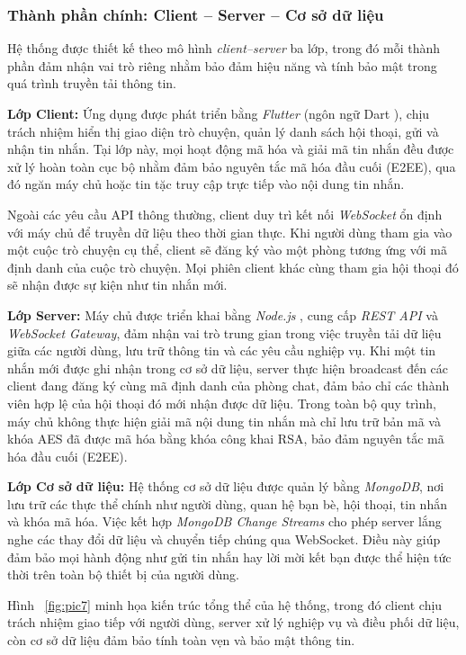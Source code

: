 \subsubsection{Thành phần chính: Client – Server – Cơ sở dữ liệu}
\indent Hệ thống được thiết kế theo mô hình \textit{client–server} ba lớp, trong đó mỗi thành phần đảm nhận vai trò riêng nhằm bảo đảm hiệu năng và tính bảo mật trong quá trình truyền tải thông tin.

\indent \textbf{Lớp Client:} Ứng dụng được phát triển bằng \textit{Flutter} (ngôn ngữ Dart \cite{dart_spec}), chịu trách nhiệm hiển thị giao diện trò chuyện, quản lý danh sách hội thoại, gửi và nhận tin nhắn.  
Tại lớp này, mọi hoạt động mã hóa và giải mã tin nhắn đều được xử lý hoàn toàn cục bộ nhằm đảm bảo nguyên tắc mã hóa đầu cuối (E2EE), qua đó ngăn máy chủ hoặc tin tặc truy cập trực tiếp vào nội dung tin nhắn.

\indent Ngoài các yêu cầu API thông thường, client duy trì kết nối \textit{WebSocket} ổn định với máy chủ để truyền dữ liệu theo thời gian thực. Khi người dùng tham gia vào một cuộc trò chuyện cụ thể, client sẽ đăng ký vào một phòng tương ứng với mã định danh của cuộc trò chuyện.  
Mọi phiên client khác cùng tham gia hội thoại đó sẽ nhận được sự kiện như tin nhắn mới.

\indent \textbf{Lớp Server:} Máy chủ được triển khai bằng \textit{Node.js} \cite{nodejs_website}, cung cấp \textit{REST API} và \textit{WebSocket Gateway}, đảm nhận vai trò trung gian trong việc truyền tải dữ liệu giữa các người dùng, lưu trữ thông tin và các yêu cầu nghiệp vụ.  
Khi một tin nhắn mới được ghi nhận trong cơ sở dữ liệu, server thực hiện broadcast đến các client đang đăng ký cùng mã định danh của phòng chat, đảm bảo chỉ các thành viên hợp lệ của hội thoại đó mới nhận được dữ liệu.  
Trong toàn bộ quy trình, máy chủ không thực hiện giải mã nội dung tin nhắn mà chỉ lưu trữ bản mã và khóa AES đã được mã hóa bằng khóa công khai RSA, bảo đảm nguyên tắc mã hóa đầu cuối (E2EE).

\indent \textbf{Lớp Cơ sở dữ liệu:} Hệ thống cơ sở dữ liệu được quản lý bằng \textit{MongoDB}, nơi lưu trữ các thực thể chính như người dùng, quan hệ bạn bè, hội thoại, tin nhắn và khóa mã hóa.  
Việc kết hợp \textit{MongoDB Change Streams} cho phép server lắng nghe các thay đổi dữ liệu và chuyển tiếp chúng qua WebSocket. Điều này giúp đảm bảo mọi hành động như gửi tin nhắn hay lời mời kết bạn được thể hiện tức thời trên toàn bộ thiết bị của người dùng.

\indent Hình ~\ref{fig:pic7} minh họa kiến trúc tổng thể của hệ thống, trong đó client chịu trách nhiệm giao tiếp với người dùng, server xử lý nghiệp vụ và điều phối dữ liệu, còn cơ sở dữ liệu đảm bảo tính toàn vẹn và bảo mật thông tin.

